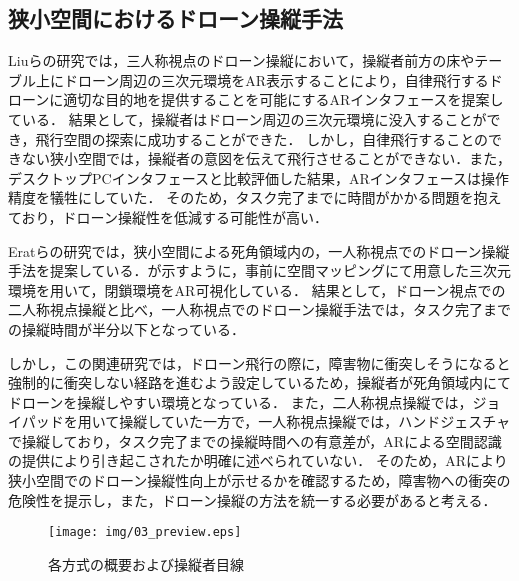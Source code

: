 \documentclass[submit, sigrecommended]{ipsj}
\begin{document}

\subsection{狭小空間におけるドローン操縦手法}

Liuらの研究\cite{book-ar04}では，三人称視点のドローン操縦において，操縦者前方の床やテーブル上にドローン周辺の三次元環境をAR表示することにより，自律飛行するドローンに適切な目的地を提供することを可能にするARインタフェースを提案している．
結果として，操縦者はドローン周辺の三次元環境に没入することができ，飛行空間の探索に成功することができた．
しかし，自律飛行することのできない狭小空間では，操縦者の意図を伝えて飛行させることができない．また，デスクトップPCインタフェースと比較評価した結果，ARインタフェースは操作精度を犠牲にしていた．
そのため，タスク完了までに時間がかかる問題を抱えており，ドローン操縦性を低減する可能性が高い．

Eratらの研究\cite{article-ar05}では，狭小空間による死角領域内の，一人称視点でのドローン操縦手法を提案している．が示すように，事前に空間マッピングにて用意した三次元環境を用いて，閉鎖環境をAR可視化している．
結果として，ドローン視点での二人称視点操縦と比べ，一人称視点でのドローン操縦手法では，タスク完了までの操縦時間が半分以下となっている．

しかし，この関連研究では，ドローン飛行の際に，障害物に衝突しそうになると強制的に衝突しない経路を進むよう設定しているため，操縦者が死角領域内にてドローンを操縦しやすい環境となっている．
また，二人称視点操縦では，ジョイパッドを用いて操縦していた一方で，一人称視点操縦では，ハンドジェスチャで操縦しており，タスク完了までの操縦時間への有意差が，ARによる空間認識の提供により引き起こされたか明確に述べられていない．
そのため，ARにより狭小空間でのドローン操縦性向上が示せるかを確認するため，障害物への衝突の危険性を提示し，また，ドローン操縦の方法を統一する必要があると考える．


\begin{figure*}[!tb]
  \centering
  \texttt{[image: img/03\_preview.eps]}
  \caption{各方式の概要および操縦者目線}
  \label{fig:03_preview}
\end{figure*}

\end{document}
